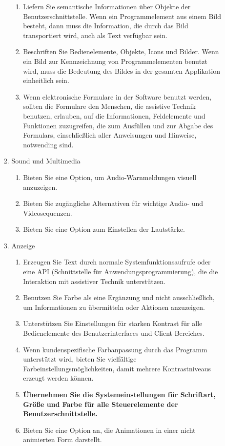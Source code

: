 \documentclass[paper=a4, fontsize=11pt]{scrartcl} %
\numberwithin{equation}{section} %
\numberwithin{figure}{section} %
\numberwithin{table}{section} %
\begin{document}
\begin{itemize}
\begin{itemize}
\begin{enumerate}[label*=\arabic*.]
\begin{enumerate}[label*=\arabic*.]
\item Liefern Sie semantische Informationen über Objekte der Benutzerschnittstelle. Wenn ein Programmelement aus einem Bild besteht, dann muss die Information, die durch das Bild transportiert wird, auch als Text verfügbar sein.
\item Beschriften Sie Bedienelemente, Objekte, Icons und Bilder. Wenn ein Bild zur Kennzeichnung von Programmelementen benutzt wird, muss die Bedeutung des Bildes in der gesamten Applikation einheitlich sein.
\item Wenn elektronische Formulare in der Software benutzt werden, sollten die Formulare den Menschen, die assistive Technik benutzen, erlauben, auf die Informationen, Feldelemente und Funktionen zuzugreifen, die zum Ausfüllen und zur Abgabe des Formulars, einschließlich aller Anweisungen und Hinweise, notwending sind.
\end{enumerate}
\item Sound und Multimedia
\begin{enumerate}[label*=\arabic*.]
\item Bieten Sie eine Option, um Audio-Warnmeldungen visuell anzuzeigen.
\item Bieten Sie zugängliche Alternativen für wichtige Audio- und Videosequenzen.
\item Bieten Sie eine Option zum Einstellen der Lautstärke.
\end{enumerate}
\item Anzeige
\begin{enumerate}[label*=\arabic*.]
\item Erzeugen Sie Text durch normale Systemfunktionsaufrufe oder eine API (Schnittstelle für Anwendungsprogrammierung), die die Interaktion mit assistiver Technik unterstützen.
\item Benutzen Sie Farbe als eine Ergänzung und nicht ausschließlich, um Informationen zu übermitteln oder Aktionen anzuzeigen.
\item Unterstützen Sie Einstellungen für starken Kontrast für alle Bedienelemente des Benutzerinterfaces und Client-Bereiches.
\item Wenn kundenspezifische Farbanpassung durch das Programm unterstützt wird, bieten Sie vielfältige Farbeinstellungsmöglichkeiten, damit mehrere Kontrastniveaus erzeugt werden können.
\item \textbf{Übernehmen Sie die Systemeinstellungen für Schriftart, Größe und Farbe für alle Steuerelemente der Benutzerschnittstelle.}
\item Bieten Sie eine Option an, die Animationen in einer nicht animierten Form darstellt.

\end{enumerate}
\end{enumerate}
\end{itemize}
\end{itemize}
\end{document}
